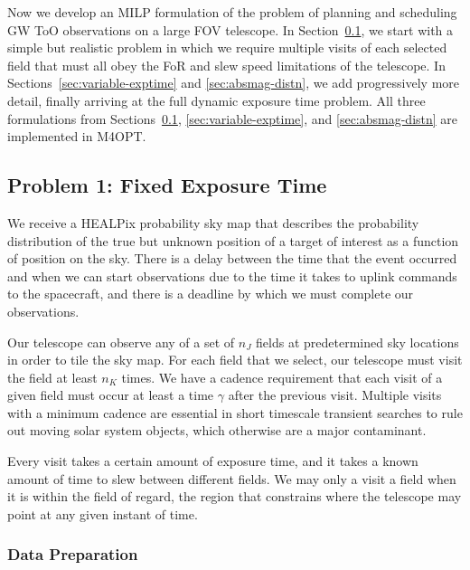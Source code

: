 \documentclass[twocolumn,times]{aastex631}
\begin{document}
Now we develop an \ac{MILP} formulation of the problem of planning and scheduling \ac{GW} \ac{ToO} observations on a large \ac{FOV} telescope. In Section~\ref{sec:fixed-exptime}, we start with a simple but realistic problem in which we require multiple visits of each selected field that must all obey the \ac{FoR} and slew speed limitations of the telescope. In Sections~\ref{sec:variable-exptime} and \ref{sec:absmag-distn}, we add progressively more detail, finally arriving at the full dynamic exposure time problem. All three formulations from Sections~\ref{sec:fixed-exptime}, \ref{sec:variable-exptime}, and \ref{sec:absmag-distn} are implemented in \ac{M4OPT}.

\subsection{Problem 1: Fixed Exposure Time}
\label{sec:fixed-exptime}

We receive a \ac{HEALPix} probability sky map that describes the probability distribution of the true but unknown position of a target of interest as a function of position on the sky. There is a delay between the time that the event occurred and when we can start observations due to the time it takes to uplink commands to the spacecraft, and there is a deadline by which we must complete our observations.

Our telescope can observe any of a set of $n_J$ fields at predetermined sky locations in order to tile the sky map. For each field that we select, our telescope must visit the field at least $n_K$ times. We have a cadence requirement that each visit of a given field must occur at least a time $\gamma$ after the previous visit. Multiple visits with a minimum cadence are essential in short timescale transient searches to rule out moving solar system objects, which otherwise are a major contaminant.

Every visit takes a certain amount of exposure time, and it takes a known amount of time to slew between different fields. We may only a visit a field when it is within the field of regard, the region that constrains where the telescope may point at any given instant of time.

\subsubsection{Data Preparation}
\end{document}
